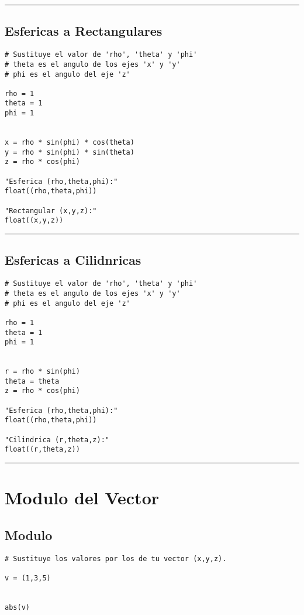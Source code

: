 \documentclass{article}
\begin{document}
\noindent\rule{\textwidth}{0.5pt}

\newpage

\subsection{Esfericas a Rectangulares}
\label{sec:orgdccd99e}
\begin{verbatim}
# Sustituye el valor de 'rho', 'theta' y 'phi'
# theta es el angulo de los ejes 'x' y 'y'
# phi es el angulo del eje 'z'

rho = 1
theta = 1
phi = 1


x = rho * sin(phi) * cos(theta)
y = rho * sin(phi) * sin(theta)
z = rho * cos(phi)

"Esferica (rho,theta,phi):"
float((rho,theta,phi))

"Rectangular (x,y,z):"
float((x,y,z))
\end{verbatim}

\noindent\rule{\textwidth}{0.5pt}

\newpage 

\subsection{Esfericas a Cilidnricas}
\label{sec:org7266a40}
\begin{verbatim}
# Sustituye el valor de 'rho', 'theta' y 'phi'
# theta es el angulo de los ejes 'x' y 'y'
# phi es el angulo del eje 'z'

rho = 1
theta = 1
phi = 1


r = rho * sin(phi)
theta = theta
z = rho * cos(phi)

"Esferica (rho,theta,phi):"
float((rho,theta,phi))

"Cilindrica (r,theta,z):"
float((r,theta,z))
\end{verbatim}

\noindent\rule{\textwidth}{0.5pt}

\newpage

\section{Modulo del Vector}
\label{sec:orgcd3fcab}
\subsection{Modulo}
\label{sec:org904fb0c}
\begin{verbatim}
# Sustituye los valores por los de tu vector (x,y,z).

v = (1,3,5)


abs(v)
\end{verbatim}
\end{document}
